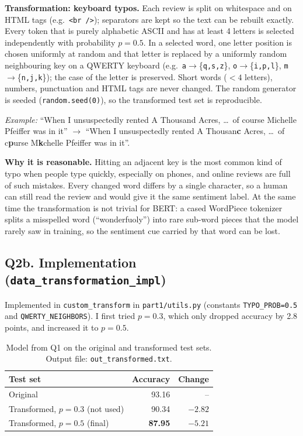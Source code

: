\documentclass[11pt]{article}
\begin{document}
\textbf{Transformation: keyboard typos.} Each review is split on whitespace and on HTML tags
(e.g.\ \texttt{<br />}); separators are kept so the text can be rebuilt exactly. Every token that is purely
alphabetic ASCII and has at least 4 letters is selected independently with probability $p=0.5$. In a selected
word, one letter position is chosen uniformly at random and that letter is replaced by a uniformly random
neighbouring key on a QWERTY keyboard (e.g.\ \texttt{a}$\to$\{\texttt{q,s,z}\}, \texttt{o}$\to$\{\texttt{i,p,l}\},
\texttt{m}$\to$\{\texttt{n,j,k}\}); the case of the letter is preserved. Short words ($<4$ letters), numbers,
punctuation and HTML tags are never changed. The random generator is seeded (\texttt{random.seed(0)}), so the
transformed test set is reproducible.

\textit{Example:} ``When I unsuspectedly rented A Thousand Acres, \ldots\ of course Michelle Pfeiffer was in it''
$\to$ ``When I unsuspectedly rented A Thousan\textbf{c} Acres, \ldots\ of c\textbf{p}urse M\textbf{k}chelle
Pfeiffer was in it''.

\textbf{Why it is reasonable.} Hitting an adjacent key is the most common kind of typo when people type
quickly, especially on phones, and online reviews are full of such mistakes. Every changed word differs by a
single character, so a human can still read the review and would give it the same sentiment label. At the
same time the transformation is not trivial for BERT: a cased WordPiece tokenizer splits a misspelled word
(``wonderfuoly'') into rare sub-word pieces that the model rarely saw in training, so the sentiment cue carried
by that word can be lost.

\subsection{Q2b. Implementation (\texttt{data\_transformation\_impl})}

Implemented in \texttt{custom\_transform} in \texttt{part1/utils.py} (constants \texttt{TYPO\_PROB=0.5} and
\texttt{QWERTY\_NEIGHBORS}). I first tried $p=0.3$, which only dropped accuracy by 2.8 points, and increased it to
$p=0.5$.

\begin{table}[H]
\centering
\begin{tabular}{lrr}
\toprule
Test set & Accuracy & Change \\
\midrule
Original & 93.16 & -- \\
Transformed, $p=0.3$ (not used) & 90.34 & $-2.82$ \\
Transformed, $p=0.5$ (final) & \textbf{87.95} & $\mathbf{-5.21}$ \\
\bottomrule
\end{tabular}
\caption{Model from Q1 on the original and transformed test sets. Output file: \texttt{out\_transformed.txt}.}
\end{table}
\end{document}
